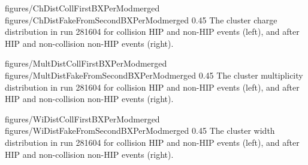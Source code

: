                  {figures/ChDistCollFirstBXPerModmerged} %
                 {figures/ChDistFakeFromSecondBXPerModmerged} %
                 {0.45}       %
                 { The cluster charge distribution in run 281604 for collision HIP and non-HIP events (left), and after HIP and non-collision non-HIP events (right).   } %

                 {figures/MultDistCollFirstBXPerModmerged} %
                 {figures/MultDistFakeFromSecondBXPerModmerged} %
                 {0.45}       %
                 { The cluster multiplicity distribution in run 281604 for collision HIP and non-HIP events (left), and after HIP and non-collision non-HIP events (right). } %

                 {figures/WiDistCollFirstBXPerModmerged} %
                 {figures/WiDistFakeFromSecondBXPerModmerged} %
                 {0.45}       %
                 {  The cluster width distribution in run 281604 for collision HIP and non-HIP events (left), and after HIP and non-collision non-HIP events (right).} %


\begin{table}
\begin{center}
\caption[Table caption text]{The average cluster charge, multiplicity and width and the fraction of clusters larger than 10 strips for four categories defined in Table~\ref{tab:eventCategories} for run 281604. These quantities are computed from both on-track and off-track clusters.}
\label{tab:clusterCategories}
\end{center}
\end{table}

